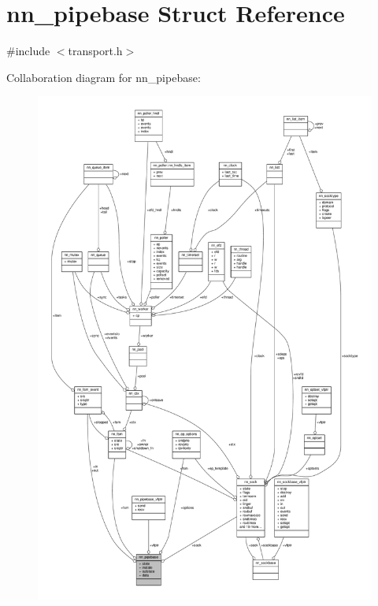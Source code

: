 \hypertarget{structnn__pipebase}{}\section{nn\+\_\+pipebase Struct Reference}
\label{structnn__pipebase}


{\ttfamily \#include $<$transport.\+h$>$}



Collaboration diagram for nn\+\_\+pipebase\+:\nopagebreak
\begin{figure}[H]
\begin{center}
\leavevmode
\includegraphics[width=350pt]{structnn__pipebase__coll__graph}
\end{center}
\end{figure}
